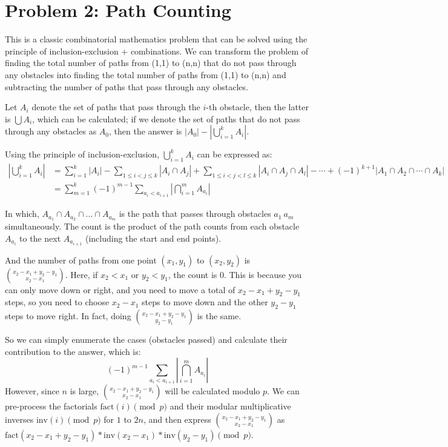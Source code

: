 \documentclass[11pt, a4paper, oneside]{memoir}
\begin{document}
\chapter{Problem 2: Path Counting}
This is a classic combinatorial mathematics problem that can be solved using the principle of
inclusion-exclusion + combinations. We can transform the problem of finding the total number of paths from (1,1) to (n,n)
that do not pass through any obstacles into finding the total number of paths from (1,1) to (n,n)
and subtracting the number of paths that pass through any obstacles.

Let $A_i$ denote the set of paths that pass through the $i$-th obstacle, then the latter is $\bigcup A_i$, which can be calculated;
if we denote the set of paths that do not pass through any obstacles as $A_0$,
then the answer is $|A_0|-|\bigcup_{i=1}^{k} A_i|$.

Using the principle of inclusion-exclusion, $\bigcup_{i=1}^{k} A_i$ can be expressed as:
\begin{align*}
  \left|\bigcup_{i=1}^{k} A_i\right| &= \sum_{i=1}^{k} |A_i| - \sum_{1 \le i < j \le k} |A_i \cap A_j| + \sum_{1 \le i < j < l \le k} |A_i \cap A_j \cap A_l| - \cdots + (-1)^{k+1} |A_1 \cap A_2 \cap \cdots \cap A_k| \\
  &= \sum_{m=1}^{k}\left(-1\right)^{m-1}\sum_{a_i<a_{i+1}}\left| \bigcap_{i=1}^{m} A_{a_i} \right|
\end{align*}

In which, $A_{a_1}\cap A_{a_2}\cap ...\cap A_{a_m}$ is the path that passes through obstacles $a_1~a_m$ simultaneously.
The count is the product of the path counts from each obstacle $A_{a_i}$ to the next $A_{a_{i+1}}$ (including the start and end points).

And the number of paths from one point $(x_1, y_1)$ to $(x_2, y_2)$ is $\binom{x_2-x_1+y_2-y_1}{x_2-x_1}$.
Here, if $x_2<x_1$ or $y_2<y_1$, the count is 0. This is because you can only move down or right,
and you need to move a total of $x_2-x_1+y_2-y_1$ steps, so you need to choose $x_2-x_1$ steps to move down
and the other $y_2-y_1$ steps to move right. In fact, doing $\binom{x_2-x_1+y_2-y_1}{y_2-y_1}$ is the same.

So we can simply enumerate the cases (obstacles passed) and calculate their contribution to the answer, which is:
\[ \left(-1\right)^{m-1}\sum_{a_i<a_{i+1}}\left| \bigcap_{i=1}^{m} A_{a_i} \right| \]
However, since $n$ is large, $\binom{x_2-x_1+y_2-y_1}{x_2-x_1}$ will be calculated modulo $p$.
We can pre-process the factorials $\text{fact}(i) \pmod{p}$ and their modular multiplicative inverses $\text{inv}(i) \pmod{p}$ for $1$ to $2n$,
and then express $\binom{x_2-x_1+y_2-y_1}{x_2-x_1}$ as $\text{fact}(x_2-x_1+y_2-y_1)*\text{inv}(x_2-x_1)*\text{inv}(y_2-y_1) \pmod{p}$.
\end{document}
